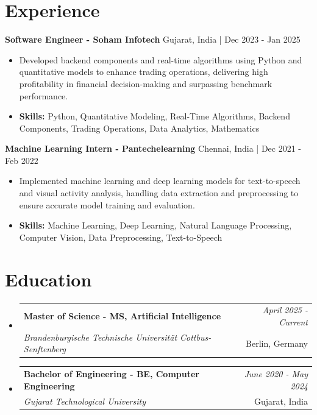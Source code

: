 \documentclass[a4paper,11pt]{article}
\makeatletter
\newcommand{\resumeSubheading}[4]{
\vspace{0.5mm}\item
    \begin{tabular*}{\linewidth}[t]{l@{\extracolsep{\fill}}r}
        \textbf{#1} & \textit{\footnotesize{#4}} \\
        \textit{\footnotesize{#3}} &  \footnotesize{#2}\\
    \end{tabular*}
    \vspace{-2.4mm}
}
\makeatother
\begin{document}
\section{\textbf{Experience}}


\vspace{1mm}
  \textbf{Software Engineer - Soham Infotech} \hfill Gujarat, India | Dec 2023 - Jan 2025
\vspace{-1.5mm} %
\begin{itemize}
  \item Developed backend components and real-time algorithms using Python and quantitative models to enhance trading operations, delivering high profitability in financial decision-making and surpassing benchmark performance.

\vspace{-2mm}
  \item \textbf{Skills:} Python, Quantitative Modeling, Real-Time Algorithms, Backend Components, Trading Operations, Data Analytics, Mathematics
\end{itemize}

\vspace{1mm}
  \textbf{Machine Learning Intern - Pantechelearning} \hfill Chennai, India | Dec 2021 - Feb 2022
\vspace{-1.5mm} %
\begin{itemize}
  \item Implemented machine learning and deep learning models for text-to-speech and visual activity analysis, handling data extraction and preprocessing to ensure accurate model training and evaluation.
\vspace{-2mm}
  \item \textbf{Skills:} Machine Learning, Deep Learning, Natural Language Processing, Computer Vision, Data Preprocessing, Text-to-Speech
\end{itemize}\section{\textbf{Education}}
\vspace{-0.4mm}

\begin{itemize}[leftmargin=0.15in, label={}]
\resumeSubheading
{Master of Science - MS, Artificial Intelligence }{Berlin, Germany}
{Brandenburgische Technische Universität Cottbus-Senftenberg  }{April 2025 - Current}

\vspace{1.0mm} %
\resumeSubheading
{Bachelor of Engineering - BE, Computer Engineering  }{Gujarat, India}
{Gujarat Technological University }{June 2020 - May 2024}

\end{itemize}
\end{document}
